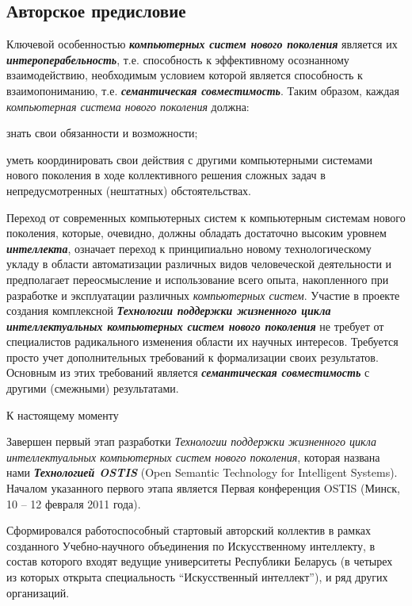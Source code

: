 \begin{partbacktext}
\part*{Авторское предисловие}
\label{chap_preface_auth}

Ключевой особенностью \textbf{\textit{компьютерных систем нового поколения}} является их \textbf{\textit{интероперабельность}}, т.е. способность к эффективному осознанному взаимодействию, необходимым условием которой является способность к взаимопониманию, т.е. \textbf{\textit{семантическая совместимость}}. Таким образом, каждая \textit{компьютерная система нового поколения} должна:

\begin{textitemize}
	\item знать свои обязанности и возможности;
	\item уметь координировать свои действия с другими компьютерными системами нового поколения в ходе коллективного решения сложных задач в непредусмотренных (нештатных) обстоятельствах.
\end{textitemize}

Переход от современных компьютерных систем к компьютерным системам нового поколения, которые, очевидно, должны обладать достаточно высоким уровнем \textbf{\textit{интеллекта}}, означает переход к принципиально новому технологическому укладу в области автоматизации различных видов человеческой деятельности и предполагает переосмысление и использование всего опыта, накопленного при разработке и эксплуатации различных \textit{компьютерных систем}. Участие в проекте создания комплексной \textbf{\textit{Технологии поддержки жизненного цикла интеллектуальных компьютерных систем нового поколения}} не требует от специалистов радикального изменения области их научных интересов. Требуется просто учет дополнительных требований к формализации своих результатов. Основным из этих требований является \textbf{\textit{семантическая совместимость}} с другими (смежными) результатами.

К настоящему моменту 
\begin{textitemize}
	\item Завершен первый этап разработки \textit{Технологии поддержки жизненного цикла интеллектуальных компьютерных систем нового поколения}, которая названа нами \textbf{\textit{Технологией OSTIS}} (Open Semantic Technology for Intelligent Systems). Началом указанного первого этапа является Первая конференция OSTIS (Минск, 10 -- 12 февраля 2011 года).
	\item Сформировался работоспособный стартовый авторский коллектив в рамках созданного Учебно-научного объединения по Искусственному интеллекту, в состав которого входят ведущие университеты Республики Беларусь (в четырех из которых открыта специальность ``Искусственный интеллект''), и ряд других организаций.
\end{textitemize}



\end{partbacktext}
